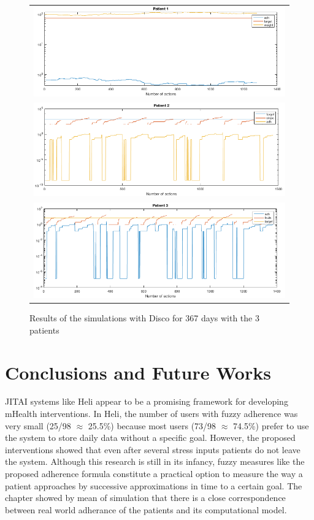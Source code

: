 \documentclass{llncs}
\begin{document}
\begin{figure}
  \begin{center}
  \begin{tabular}{c}
    \includegraphics[scale=0.5]{Patient1-365-fuzzy.png}\\
    \includegraphics[scale=0.5]{Patient2-365-fuzzy.png}\\
    \includegraphics[scale=0.5]{Patient3-365-fuzzy.png}\\
    \end{tabular}
    \caption{Results of the simulations with Disco for 367 days with the 3 patients}
     \label{Fig.TimeSeries}
\end{center}
\end{figure} 

\section {Conclusions and Future Works}
\label{sec.conclusions}

JITAI systems like Heli appear to be a promising framework for developing mHealth interventions. In Heli, the number of users with fuzzy adherence was very small (25/98 $\approx$ 25.5\%) because most users (73/98 $\approx$ 74.5\%) prefer to use the system to store daily data without a specific goal. However, the  proposed interventions showed that even after several stress inputs patients do not leave the system. Although this research is still in its infancy, fuzzy measures like the proposed adherence formula constitute a practical option  to measure the way a patient approaches by successive approximations in time to a certain goal. The chapter showed by mean of simulation that there is a close correspondence between real world adherance of the patients and its computational model. 
\end{document}
